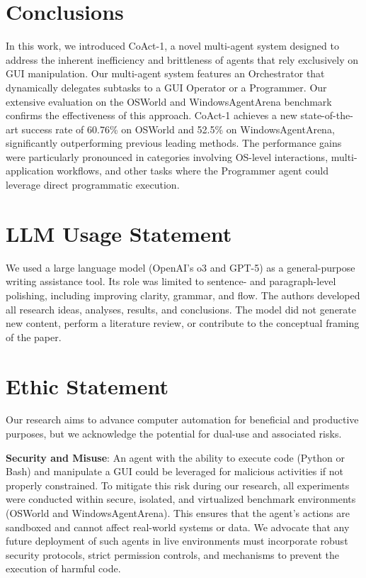 \documentclass{article} %
\newcommand{\ours}{CoAct-1\xspace}
\begin{document}


\section{Conclusions}
In this work, we introduced \ours, a novel multi-agent system designed to address the inherent inefficiency and brittleness of agents that rely exclusively on GUI manipulation. Our multi-agent system features an Orchestrator that dynamically delegates subtasks to a GUI Operator or a Programmer. Our extensive evaluation on the OSWorld and WindowsAgentArena benchmark confirms the effectiveness of this approach. \ours achieves a new state-of-the-art success rate of 60.76\% on OSWorld and 52.5\% on WindowsAgentArena, significantly outperforming previous leading methods. The performance gains were particularly pronounced in categories involving OS-level interactions, multi-application workflows, and other tasks where the Programmer agent could leverage direct programmatic execution. 




\appendix
\section{LLM Usage Statement}
We used a large language model (OpenAI’s o3 and GPT-5) as a general-purpose writing assistance tool. Its role was limited to sentence- and paragraph-level polishing, including improving clarity, grammar, and flow. The authors developed all research ideas, analyses, results, and conclusions. The model did not generate new content, perform a literature review, or contribute to the conceptual framing of the paper.

\section{Ethic Statement}
Our research aims to advance computer automation for beneficial and productive purposes, but we acknowledge the potential for dual-use and associated risks.

\noindent\textbf{Security and Misuse}: An agent with the ability to execute code (Python or Bash) and manipulate a GUI could be leveraged for malicious activities if not properly constrained. To mitigate this risk during our research, all experiments were conducted within secure, isolated, and virtualized benchmark environments (OSWorld and WindowsAgentArena). This ensures that the agent's actions are sandboxed and cannot affect real-world systems or data. We advocate that any future deployment of such agents in live environments must incorporate robust security protocols, strict permission controls, and mechanisms to prevent the execution of harmful code.
\end{document}
